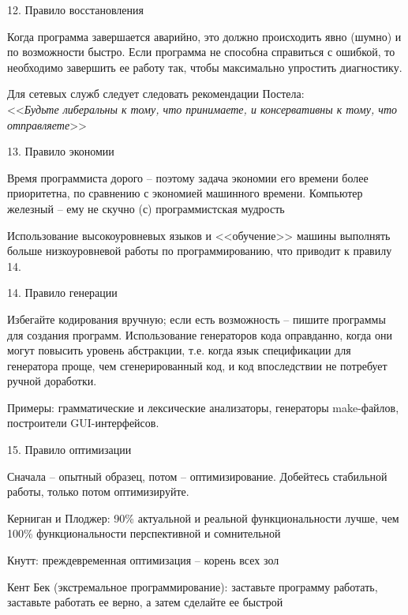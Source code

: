 \begin{frame}{12. Правило восстановления}
	\begin{block}{Когда программа завершается аварийно,  это должно происходить явно (шумно) и по возможности быстро.}
		\pause
		Если программа не способна справиться с ошибкой,  то необходимо завершить ее работу так,  чтобы максимально упростить диагностику.
	\end{block}
	\pause
	Для сетевых служб следует следовать рекомендации Постела:\\
	<<{\itshape Будьте либеральны к тому,  что принимаете,  и консервативны к тому,  что отправляете}>>
\end{frame}

\begin{frame}{13. Правило экономии}
	\begin{block}{Время программиста дорого -- поэтому задача экономии его времени более приоритетна,  по сравнению с экономией машинного времени.}
		\pause
		Компьютер железный -- ему не скучно (с) программистская мудрость
	\end{block}
	\pause
	Использование высокоуровневых языков и <<обучение>> машины выполнять больше низкоуровневой работы по программированию,  что приводит к правилу 14.
\end{frame}

\begin{frame}{14. Правило генерации}
	\begin{block}{Избегайте кодирования вручную; если есть возможность -- пишите программы для создания программ.}
		\pause
		Использование генераторов кода оправданно,  когда они могут повысить уровень абстракции,  
		т.е. когда язык спецификации для генератора проще,  чем сгенерированный код,  
		и код впоследствии не потребует ручной доработки.
	\end{block}
	\pause
	Примеры: грамматические и лексические анализаторы,  генераторы make-файлов,  построители GUI-интерфейсов.
\end{frame}

\begin{frame}{15. Правило оптимизации}
	\begin{block}{Сначала -- опытный образец,  потом -- оптимизирование.}
		Добейтесь стабильной работы,  только потом оптимизируйте.
	\end{block}
	\pause
	\begin{block}{Керниган и Плоджер:}
		90\% актуальной и реальной функциональности лучше,  чем 100\% функциональности перспективной и сомнительной
	\end{block}
	\pause
	\begin{block}{Кнутт:}
		преждевременная оптимизация -- корень всех зол
	\end{block}
	\pause
	\begin{block}{Кент Бек (экстремальное программирование):}
		заставьте программу работать,  заставьте работать ее верно,  а затем сделайте ее быстрой
	\end{block}
\end{frame}

